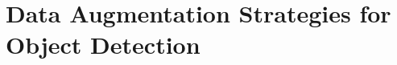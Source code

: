 %
\section{Data Augmentation Strategies for Object Detection}
\label{sec:nn-augmentation-strategies}
